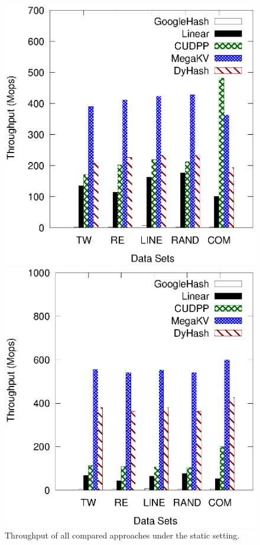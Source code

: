 %
\begin{figure}[t]
	\begin{minipage}{0.48\linewidth}\centering
		\includegraphics[width=\linewidth]{pic/static/static_insert.eps}
		\centerline{}
	\end{minipage}
	\hfill
	\begin{minipage}{0.48\linewidth}\centering
		\includegraphics[width=\linewidth]{pic/static/static_search.eps}
		\centerline{}
	\end{minipage}
	\caption{Throughput of all compared approaches under the static setting.}
	\label{fig:static}
\end{figure}
%

